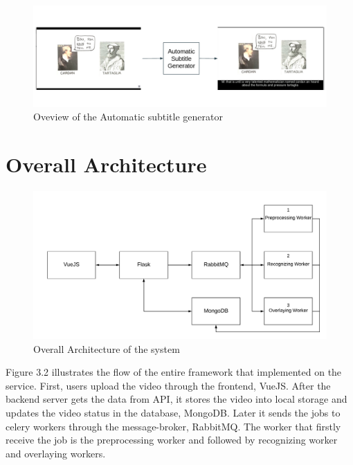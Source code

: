 \documentclass[natbib]{muthesis}
\begin{document}
 \begin{figure}[H]
 	\centering
 	\captionsetup{justification=centering}
 	\includegraphics[width=1.0\linewidth]{images/overview-asg}
 	\caption{Oveview of the Automatic subtitle generator}
 	\label{fig:overview-asg}
 \end{figure}
 \section{Overall Architecture}
 
 \begin{figure}[H]
 	\centering
 	\captionsetup{justification=centering}
 	\includegraphics[width=1.0\linewidth]{images/overall-architecture}
 	\caption{Overall Architecture of the system}
 	\label{fig:overall-architecture}
 \end{figure}
 
 Figure 3.2 illustrates the flow of the entire framework that implemented on the service. First, users upload the video through the frontend, VueJS. After the backend server gets the data from API, it stores the video into local storage and updates the video status in the database, MongoDB. Later it sends the jobs to celery workers through the message-broker, RabbitMQ. The worker that firstly receive the job is the preprocessing worker and followed by recognizing worker and overlaying workers.
 
\end{document}
